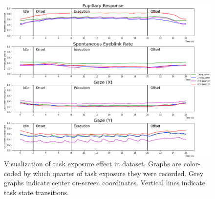 \begin{figure}[h]
    \centering
    \includegraphics[width=\textwidth]{figures/impl_taskexposurevisualization.png}
    \caption{Visualization of task exposure effect in dataset. Graphs are color-coded by which quarter of task exposure they were recorded. Grey graphs indicate center on-screen coordinates. Vertical lines indicate task state transitions.}
    \label{fig:res/taskexposure}
\end{figure}
\FloatBarrier